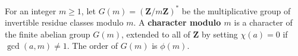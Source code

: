 For an integer $m \geq 1$, let $G(m) = (\mathbf{Z}/m\mathbf{Z})^*$ be the multiplicative group of invertible residue classes modulo $m$. A \textbf{character modulo $m$} is a character of the finite abelian group $G(m)$, extended to all of $\mathbf{Z}$ by setting $\chi(a) = 0$ if $\gcd(a,m) \neq 1$. The order of $G(m)$ is $\phi(m)$.
